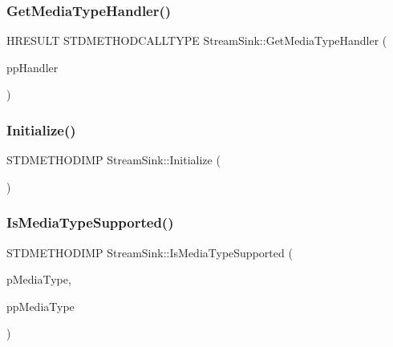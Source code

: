 \mbox{\label{class_stream_sink_ad56edf7f83f6c4ab004476f276cd50a0}} 
\subsubsection{\texorpdfstring{Get\+Media\+Type\+Handler()}{GetMediaTypeHandler()}}
{\footnotesize\ttfamily H\+R\+E\+S\+U\+LT S\+T\+D\+M\+E\+T\+H\+O\+D\+C\+A\+L\+L\+T\+Y\+PE Stream\+Sink\+::\+Get\+Media\+Type\+Handler (\begin{DoxyParamCaption}\item[{\+\_\+\+\_\+\+R\+P\+C\+\_\+\+\_\+deref\+\_\+out\+\_\+opt I\+M\+F\+Media\+Type\+Handler $\ast$$\ast$}]{pp\+Handler }\end{DoxyParamCaption})\hspace{0.3cm}{\ttfamily [inline]}}

\mbox{\label{class_stream_sink_a0bf67b4df06a5d26ba9dde5f0bde68af}} 
\subsubsection{\texorpdfstring{Initialize()}{Initialize()}}
{\footnotesize\ttfamily S\+T\+D\+M\+E\+T\+H\+O\+D\+I\+MP Stream\+Sink\+::\+Initialize (\begin{DoxyParamCaption}{ }\end{DoxyParamCaption})\hspace{0.3cm}{\ttfamily [inline]}}

\mbox{\label{class_stream_sink_a665aff8e79017f39a773042d18851b92}} 
\subsubsection{\texorpdfstring{Is\+Media\+Type\+Supported()}{IsMediaTypeSupported()}}
{\footnotesize\ttfamily S\+T\+D\+M\+E\+T\+H\+O\+D\+I\+MP Stream\+Sink\+::\+Is\+Media\+Type\+Supported (\begin{DoxyParamCaption}\item[{I\+M\+F\+Media\+Type $\ast$}]{p\+Media\+Type,  }\item[{I\+M\+F\+Media\+Type $\ast$$\ast$}]{pp\+Media\+Type }\end{DoxyParamCaption})\hspace{0.3cm}{\ttfamily [inline]}}



